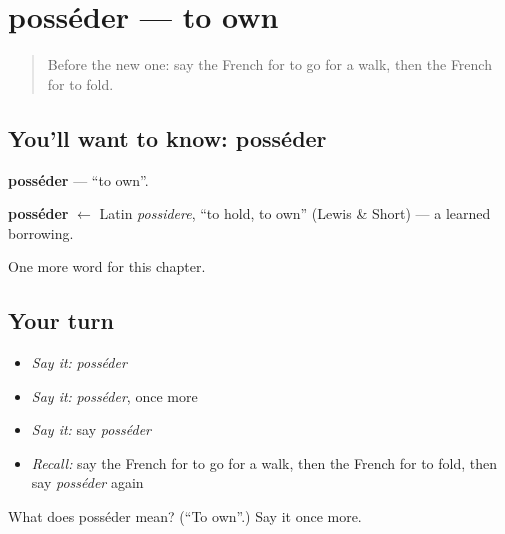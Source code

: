 \section[posséder]{posséder — to own}

\label{lesson:FR-C148-posseder}



\begin{quote}
Before the new one: say the French for to go for a walk, then the French for to fold.
\end{quote}

\subsection*{You'll want to know: posséder}
\textbf{posséder} — \textquotedblleft{}to own\textquotedblright{}.

\begin{cousinweb}
\textbf{posséder} $\leftarrow$ Latin \emph{possidere}, \textquotedblleft{}to hold, to own\textquotedblright{} (Lewis \& Short) — a learned borrowing.
\end{cousinweb}

\begin{grammarlens}[title={What you've built}]
One more word for this chapter.
\end{grammarlens}

\subsection*{Your turn}
\begin{itemize}
\raggedright
  \item \emph{Say it:} \emph{posséder}
  \item \emph{Say it:} \emph{posséder}, once more
  \item \emph{Say it:} say \emph{posséder}
  \item \emph{Recall:} say the French for to go for a walk, then the French for to fold, then say \emph{posséder} again
\end{itemize}

\begin{tcolorbox}[breakable,colback=teal!4,colframe=teal!35!black,title={Before you move on}]
What does posséder mean? (\textquotedblleft{}To own\textquotedblright{}.) Say it once more.
\end{tcolorbox}
